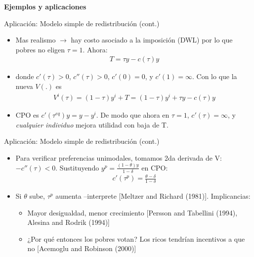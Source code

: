 \documentclass[
  ignorenonframetext,
]{beamer}
\providecommand{\tightlist}{%
  \setlength{\itemsep}{0pt}\setlength{\parskip}{0pt}}\usepackage{longtable,booktabs,array}
\begin{document}
\begin{frame}{\textbf{Ejemplos y aplicaciones}}
\begin{block}{Aplicación: Modelo simple de redistribución (cont.)}
\protect\hypertarget{aplicaciuxf3n-modelo-simple-de-redistribuciuxf3n-cont.-1}{}
\begin{itemize}
\tightlist
\item
  Mas realismo \(\longrightarrow\) hay costo asociado a la imposición
  (DWL) por lo que pobres no eligen \(\tau=1\). Ahora: \[\begin{aligned}
  T=\tau y - c(\tau)y
  \end{aligned}\]
\item
  donde \(c'(\tau)>0\), \(c''(\tau)>0\), \(c'(0)=0\), y
  \(c'(1)=\infty\). Con lo que la nueva \(V(.)\) es \[\begin{aligned}
  V^{i}(\tau)=(1-\tau)y^{i}+T=(1-\tau)y^{i} +\tau y - c(\tau)y
  \end{aligned}\]
\item
  CPO es \(c'(\tau^{eq})y=y-y^{i}\). De modo que ahora en \(\tau=1\),
  \(c'(\tau)=\infty\), y \emph{cualquier individuo} mejora utilidad con
  baja de T.
\end{itemize}
\end{block}

\begin{block}{Aplicación: Modelo simple de redistribución (cont.)}
\protect\hypertarget{aplicaciuxf3n-modelo-simple-de-redistribuciuxf3n-cont.-2}{}
\begin{itemize}
\tightlist
\item
  Para verificar preferencias unimodales, tomamos 2da derivada de V:
  \(-c''(\tau)<0\). Sustituyendo \(y^{p}=\frac{(1-\theta)y}{1-\delta}\)
  en CPO: \[\begin{aligned}
  c'(\tau^{p})=\frac{\theta-\delta}{1-\delta}
  \end{aligned}\]
\item
  Si \(\theta\) sube, \(\tau^{p}\) aumenta --interprete {[}Meltzer and
  Richard (1981){]}. Implicancias:

  \begin{itemize}
  \tightlist
  \item
    Mayor desigualdad, menor crecimiento {[}Persson and Tabellini
    (1994), Alesina and Rodrik (1994){]}
  \item
    ¿Por qué entonces los pobres votan? Los ricos tendrían incentivos a
    que no {[}Acemoglu and Robinson (2000){]}
  \end{itemize}
\end{itemize}
\end{block}
\end{frame}
\end{document}

